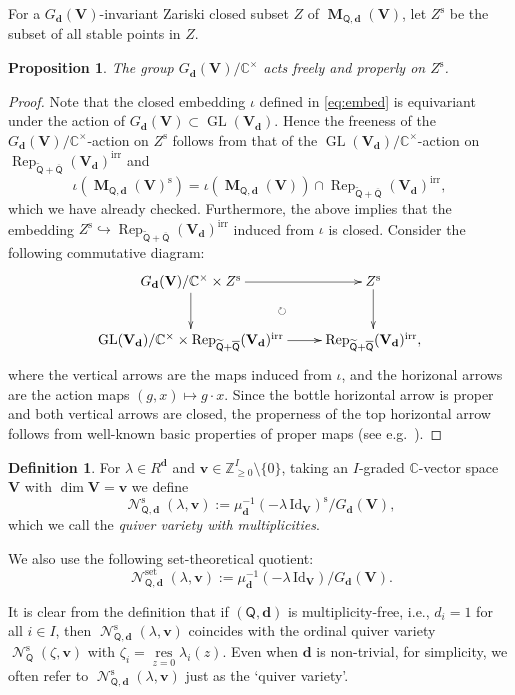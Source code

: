 \documentclass[11pt]{article}
\numberwithin{equation}{section}
\newtheorem{Proposition}[Theorem]{Proposition}
\theoremstyle{definition}
\newtheorem{Definition}[Theorem]{Definition}
\newcommand{\Z}{\mathbb{Z}} %
\newcommand{\C}{\mathbb{C}} %
\newcommand{\GL}{\operatorname{GL}} %
\newcommand{\unit}{\mathrm{Id}}
\newcommand{\Rep}{\operatorname{Rep}}
\newcommand{\bM}{\operatorname{\mathbf{M}}}
\newcommand{\bV}{\mathbf{V}}
\newcommand{\bv}{\mathbf{v}}
\newcommand{\ov}{\overline}
\newcommand{\res}{\operatorname*{res}}
\newcommand{\ved}{\mathbf{d}}
\newcommand{\irr}{\mathrm{irr}}
\newcommand{\st}{\mathrm{s}}
\newcommand{\Qst}{\operatorname{\mathscr{N}}^\mathrm{s}}
\newcommand{\Qset}{\operatorname{\mathscr{N}}^\mathrm{set}}
\newcommand{\QQ}{\mathsf{Q}} %
\begin{document}
For a $G_\ved(\bV)$-invariant Zariski closed subset $Z$ of
$\bM_{\QQ,\ved}(\bV)$,
let $Z^\st$ be the subset of all stable points in $Z$.

\begin{Proposition}
The group $G_\ved(\bV)/\C^\times$ acts
freely and properly on $Z^\st$.
\end{Proposition}

\begin{proof}
Note that
the closed embedding $\iota$ def\/ined in \eqref{eq:embed}
is equivariant under the action of
$G_\ved(\bV) \subset \GL(\bV_\ved)$.
Hence the freeness of
the $G_\ved(\bV)/\C^\times$-action on $Z^\st$
follows from that of the $\GL(\bV_\ved)/\C^\times$-action on
$\Rep_{\widetilde{\QQ}+\ov{\QQ}}(\bV_\ved)^\irr$ and
\[
\iota(\bM_{\QQ,\ved}(\bV)^\st) =
\iota(\bM_{\QQ,\ved}(\bV)) \cap \Rep_{\widetilde{\QQ}+\ov{\QQ}}(\bV_\ved)^\irr,
\]
which we have already checked.
Furthermore, the above implies that the embedding
$Z^\st \hookrightarrow \Rep_{\widetilde{\QQ}+\ov{\QQ}}(\bV_\ved)^\irr$
induced from $\iota$ is closed.
Consider the following commutative diagram:
\[
\xymatrix{
G_\ved(\bV)/\C^\times \times Z^\st
\ar[r] \ar[d] \ar@{}[rd]|{\circlearrowright} & Z^\st \ar[d] \\
\GL(\bV_\ved)/\C^\times \times
\Rep_{\widetilde{\QQ}+\ov{\QQ}}(\bV_\ved)^\irr \ar[r] &
\Rep_{\widetilde{\QQ}+\ov{\QQ}}(\bV_\ved)^\irr,
}
\]
where the vertical arrows are the maps induced from $\iota$,
and the horizonal arrows are the action maps
$(g,x) \mapsto g \cdot x$.
Since the bottle horizontal arrow is proper
and both vertical arrows are closed,
the properness of the top horizontal arrow follows from
well-known basic properties of proper maps
(see e.g.\ \cite[Corollary~4.8]{Hartshorne}).
\end{proof}

\begin{Definition}\label{dfn:q-multi}
For $\lambda \in R^\ved$ and $\bv \in \Z_{\geq 0}^I \setminus \{ 0 \}$,
taking an $I$-graded $\C$-vector space $\bV$ with $\dim \bV = \bv$
we def\/ine
\[
\Qst_{\QQ,\ved}(\lambda,\bv) :=
\mu_\ved^{-1}(-\lambda\,\unit_\bV)^\st / G_\ved(\bV),
\]
which we call the {\em quiver variety with multiplicities}.
\end{Definition}

We also use the following set-theoretical quotient:
\[
\Qset_{\QQ,\ved}(\lambda,\bv) :=
\mu_\ved^{-1}(-\lambda\,\unit_\bV) / G_\ved(\bV).
\]

It is clear from the def\/inition that if $(\QQ,\ved)$ is multiplicity-free,
i.e., $d_i=1$ for all $i \in I$,
then $\Qst_{\QQ,\ved}(\lambda,\bv)$ coincides with the ordinal quiver variety
$\Qst_\QQ(\zeta,\bv)$ with $\zeta_i = \res\limits_{z=0}\lambda_i(z)$.
Even when $\ved$ is non-trivial, for simplicity,
we often refer to $\Qst_{\QQ,\ved}(\lambda,\bv)$ just as the `quiver variety'.
\end{document}

